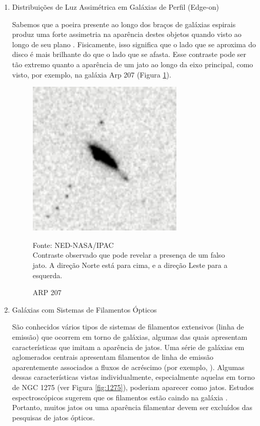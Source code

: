 \begin{enumerate}
\item Distribuições de Luz Assimétrica em Galáxias de Perfil (Edge-on)

Sabemos que a poeira presente ao longo dos braços de galáxias espirais produz uma forte assimetria na aparência destes objetos quando visto ao longo de seu plano \cite{de1958tilt}. Fisicamente, isso significa que o lado que se aproxima do disco é mais brilhante do que o lado que se afasta. Esse contraste pode ser tão extremo quanto a aparência de um jato ao longo da
eixo principal, como visto, por exemplo, na galáxia Arp 207 (Figura \ref{fig:ARP-207}).

\begin{figure}[H]
	\centering	
    \caption{ARP 207}
    \includegraphics[width=0.7\textwidth]{figuras/arp207.jpg}
   	\begin{center}
        \normalsize Fonte: NED-NASA/IPAC \\Contraste observado que pode revelar a presença de um falso jato. A direção Norte está para cima, e a direção Leste para a esquerda.
    \end{center}
	\label{fig:ARP-207}
\end{figure}


\item Galáxias com Sistemas de Filamentos Ópticos

São conhecidos vários tipos de sistemas de filamentos extensivos (linha de emissão) que ocorrem em torno de galáxias, algumas das quais apresentam características que imitam a aparência de jatos. Uma série de galáxias em aglomerados centrais apresentam filamentos de linha de emissão aparentemente associados a fluxos de acréscimo (por exemplo, \cite{heckman1981optical}). Algumas dessas características vistas individualmente, especialmente aquelas em torno de NGC 1275 (ver Figura \ref{fig:1275}), poderiam aparecer como jatos. Estudos espectroscópicos sugerem que os filamentos estão caindo na galáxia \cite{keel1985recognition}. Portanto, muitos jatos ou uma aparência filamentar devem ser excluídos das pesquisas de jatos ópticos.


\end{enumerate}
